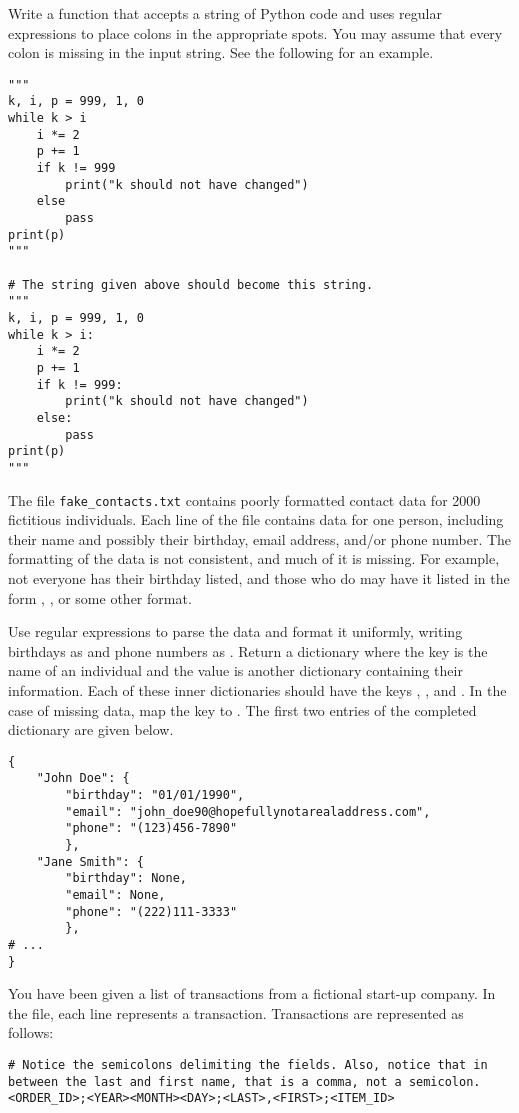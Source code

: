 Write a function that accepts a string of Python code and uses regular expressions to place colons in the appropriate spots.
You may assume that every colon is missing in the input string.
See the following for an example.

\begin{lstlisting}
"""
k, i, p = 999, 1, 0
while k > i
    i *= 2
    p += 1
    if k != 999
        print("k should not have changed")
    else
        pass
print(p)
"""

# The string given above should become this string.
"""
k, i, p = 999, 1, 0
while k > i:
    i *= 2
    p += 1
    if k != 999:
        print("k should not have changed")
    else:
        pass
print(p)
"""
\end{lstlisting}

The file \texttt{fake\_contacts.txt} contains poorly formatted contact data for 2000 fictitious individuals.
Each line of the file contains data for one person, including their name and possibly their birthday, email address, and/or phone number.
The formatting of the data is not consistent, and much of it is missing.
For example, not everyone has their birthday listed, and those who do may have it listed in the form , , or some other format.

Use regular expressions to parse the data and format it uniformly, writing birthdays as  and phone numbers as .
Return a dictionary where the key is the name of an individual and the value is another dictionary containing their information.
Each of these inner dictionaries should have the keys , , and .
In the case of missing data, map the key to .
The first two entries of the completed dictionary are given below.

\begin{lstlisting}
{
    "John Doe": {
        "birthday": "01/01/1990",
        "email": "john_doe90@hopefullynotarealaddress.com",
        "phone": "(123)456-7890"
        },
    "Jane Smith": {
        "birthday": None,
        "email": None,
        "phone": "(222)111-3333"
        },
# ...
}
\end{lstlisting}

You have been given a list of transactions from a fictional start-up company. In the  file, each line represents a transaction. Transactions are represented as follows:
\begin{lstlisting}
# Notice the semicolons delimiting the fields. Also, notice that in between the last and first name, that is a comma, not a semicolon.
<ORDER_ID>;<YEAR><MONTH><DAY>;<LAST>,<FIRST>;<ITEM_ID>
\end{lstlisting}

